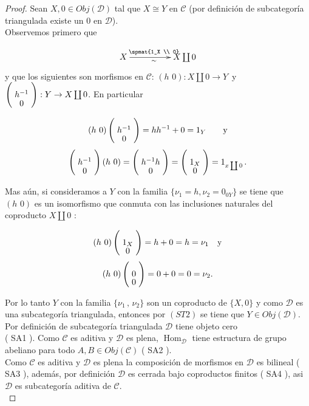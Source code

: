 \documentclass{article}
\begin{document}
\begin{enumerate}[label=\textbf{Ej \arabic*.}]
		\begin{proof}
			 Sean $X,0\in Obj(\mathscr{D})$ tal que $X\cong Y$ en $\mathscr{C}$ (por definición de subcategoría triangulada existe un $0$ en 
			$\mathscr{D}$).\\
			
			Observemos primero que
			
			\begin{equation*}
				\xymatrix@C+2pc{X\ar[r]_{\sim}^{\spmat{1_X \\ 0}}& X\coprod 0}\\
			\end{equation*}
			y que los siguientes son morfismos en $\mathscr{C}$:  $(h\,\,0): X\coprod 0\rightarrow Y$\,\,\,y\,\,\, 
			$\left(\xymatrix@R=-1mm{h^{-1}\\0}\right):Y\rightarrow X\coprod 0$. En particular 
			
			\[(h\,\,0) \left(\xymatrix@R=-1mm{h^{-1}\\0}\right)=hh^{-1} +0=1_Y\qquad \text{y}\]
			\[\left(\xymatrix@R=-1mm{h^{-1}\\0}\right) (h\,\,0)=\left(\xymatrix@R=-1mm{h^{-1}h\\0}\right)
			=\left(\xymatrix@R=-1mm{1_X\\0}\right)=1_{x\coprod 0}\,.\]
			
			Mas aún, si consideramos a $Y$ con la familia $\{\nu_1=h, \nu_2=0_{0Y}\}$ se tiene que $(h\,\,0)$ es un isomorfismo que conmuta con las 
			inclusiones naturales del coproducto $X\coprod 0$ :
			
			\[(h\,\,0) \left(\xymatrix@R=-1mm{1_X\\0}\right)=h+0=h=\nu_1\quad \text{y}\]
			\[(h\,\,0) \left(\xymatrix@R=-1mm{0\\0}\right)=0+0=0=\nu_2.\]
			
			Por lo tanto $Y$ con la familia $\{\nu_1\,,\,\nu_2\}$ son un coproducto de $\{X,0\}$ y como $\mathscr{D}$ es una subcategoría triangulada, entonces 
			por $( ST2 )$ se tiene que $Y\in Obj(\mathscr{D})$.\\
			
			 Por definición de subcategoría triangulada $\mathscr{D}$ tiene objeto cero \\( SA1 ). Como $\mathscr{C}$ es aditiva y $\mathscr{D}$ es 
			plena, $\operatorname{Hom}_{\mathscr{D}}$ tiene estructura de grupo abeliano para todo $A,B\in Obj(\mathscr{C})$ ( SA2 ).\\
			
			Como $\mathscr{C}$ es aditiva y $\mathscr{D}$ es plena la composición de morfismos en $\mathscr{D}$ es bilineal ( SA3 ), además, por definición
			$\mathscr{D}$ es cerrada bajo coproductos finitos ( SA4 ), asi $\mathscr{D}$ es  subcategoría aditiva de $\mathscr{C}$.\\
			

\end{proof}
\end{enumerate}
\end{document}
